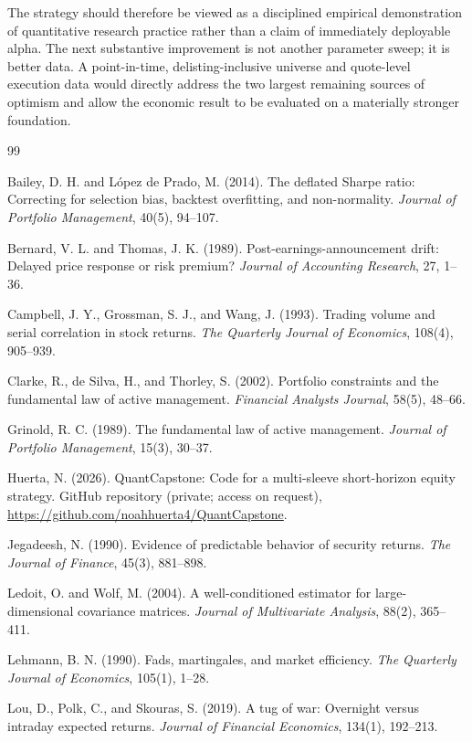 \documentclass[11pt]{article}
\begin{document}
The strategy should therefore be viewed as a disciplined empirical demonstration of quantitative research practice rather than a claim of immediately deployable alpha. The next substantive improvement is not another parameter sweep; it is better data. A point-in-time, delisting-inclusive universe and quote-level execution data would directly address the two largest remaining sources of optimism and allow the economic result to be evaluated on a materially stronger foundation.

\begin{thebibliography}{99}

Bailey, D. H. and L\'opez de Prado, M. (2014).
The deflated Sharpe ratio: Correcting for selection bias, backtest overfitting, and non-normality.
\textit{Journal of Portfolio Management}, 40(5), 94--107.

Bernard, V. L. and Thomas, J. K. (1989).
Post-earnings-announcement drift: Delayed price response or risk premium?
\textit{Journal of Accounting Research}, 27, 1--36.

Campbell, J. Y., Grossman, S. J., and Wang, J. (1993).
Trading volume and serial correlation in stock returns.
\textit{The Quarterly Journal of Economics}, 108(4), 905--939.

Clarke, R., de Silva, H., and Thorley, S. (2002).
Portfolio constraints and the fundamental law of active management.
\textit{Financial Analysts Journal}, 58(5), 48--66.

Grinold, R. C. (1989).
The fundamental law of active management.
\textit{Journal of Portfolio Management}, 15(3), 30--37.

Huerta, N. (2026).
QuantCapstone: Code for a multi-sleeve short-horizon equity strategy.
GitHub repository (private; access on request), \url{https://github.com/noahhuerta4/QuantCapstone}.

Jegadeesh, N. (1990).
Evidence of predictable behavior of security returns.
\textit{The Journal of Finance}, 45(3), 881--898.

Ledoit, O. and Wolf, M. (2004).
A well-conditioned estimator for large-dimensional covariance matrices.
\textit{Journal of Multivariate Analysis}, 88(2), 365--411.

Lehmann, B. N. (1990).
Fads, martingales, and market efficiency.
\textit{The Quarterly Journal of Economics}, 105(1), 1--28.

Lou, D., Polk, C., and Skouras, S. (2019).
A tug of war: Overnight versus intraday expected returns.
\textit{Journal of Financial Economics}, 134(1), 192--213.

\end{thebibliography}
\end{document}
